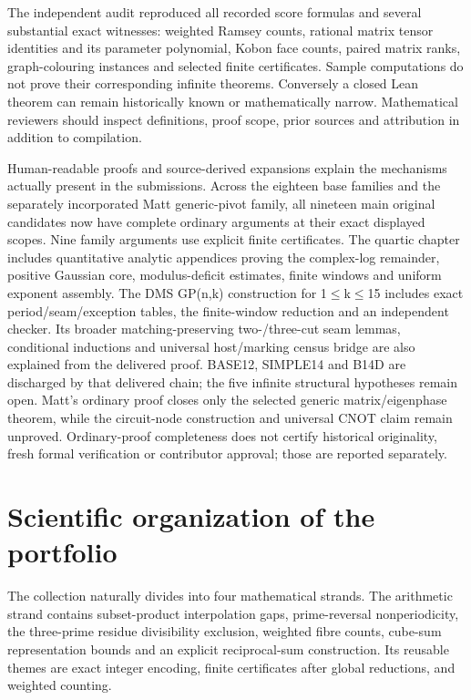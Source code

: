 \documentclass[11pt,a4paper]{article}
\begin{document}
The independent audit reproduced all recorded score formulas and several substantial exact witnesses: weighted Ramsey counts, rational matrix tensor identities and its parameter polynomial, Kobon face counts, paired matrix ranks, graph-colouring instances and selected finite certificates. Sample computations do not prove their corresponding infinite theorems. Conversely a closed Lean theorem can remain historically known or mathematically narrow. Mathematical reviewers should inspect definitions, proof scope, prior sources and attribution in addition to compilation.

Human-readable proofs and source-derived expansions explain the mechanisms actually present in the submissions. Across the eighteen base families and the separately incorporated Matt generic-pivot family, all nineteen main original candidates now have complete ordinary arguments at their exact displayed scopes. Nine family arguments use explicit finite certificates. The quartic chapter includes quantitative analytic appendices proving the complex-log remainder, positive Gaussian core, modulus-deficit estimates, finite windows and uniform exponent assembly. The DMS GP(n,k) construction for 1\ensuremath{\leq}k\ensuremath{\leq}15 includes exact period/seam/exception tables, the finite-window reduction and an independent checker. Its broader matching-preserving two-/three-cut seam lemmas, conditional inductions and universal host/marking census bridge are also explained from the delivered proof. BASE12, SIMPLE14 and B14D are discharged by that delivered chain; the five infinite structural hypotheses remain open. Matt's ordinary proof closes only the selected generic matrix/eigenphase theorem, while the circuit-node construction and universal CNOT claim remain unproved. Ordinary-proof completeness does not certify historical originality, fresh formal verification or contributor approval; those are reported separately.

\section{Scientific organization of the portfolio}
The collection naturally divides into four mathematical strands. The arithmetic strand contains subset-product interpolation gaps, prime-reversal nonperiodicity, the three-prime residue divisibility exclusion, weighted fibre counts, cube-sum representation bounds and an explicit reciprocal-sum construction. Its reusable themes are exact integer encoding, finite certificates after global reductions, and weighted counting.
\end{document}
